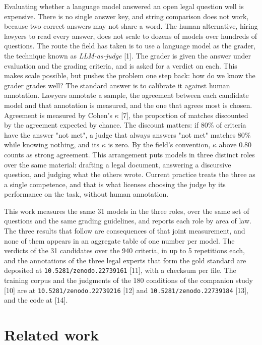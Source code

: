 \documentclass{IOS-Book-Article}
\begin{document}
Evaluating whether a language model answered an open legal question well is expensive. There is no single answer key, and string comparison does not work, because two correct answers may not share a word. The human alternative, hiring lawyers to read every answer, does not scale to dozens of models over hundreds of questions. The route the field has taken is to use a language model as the grader, the technique known as \emph{LLM-as-judge} [1]. The grader is given the answer under evaluation and the grading criteria, and is asked for a verdict on each. This makes scale possible, but pushes the problem one step back: how do we know the grader grades well? The standard answer is to calibrate it against human annotation. Lawyers annotate a sample, the agreement between each candidate model and that annotation is measured, and the one that agrees most is chosen. Agreement is measured by Cohen's $\kappa$ [7], the proportion of matches discounted by the agreement expected by chance. The discount matters: if 80\% of criteria have the answer "not met", a judge that always answers "not met" matches 80\% while knowing nothing, and its $\kappa$ is zero. By the field's convention, $\kappa$ above 0.80 counts as strong agreement. This arrangement puts models in three distinct roles over the same material: drafting a legal document, answering a discursive question, and judging what the others wrote. Current practice treats the three as a single competence, and that is what licenses choosing the judge by its performance on the task, without human annotation.

This work measures the same 31 models in the three roles, over the same set of questions and the same grading guidelines, and reports each role by area of law. The three results that follow are consequences of that joint measurement, and none of them appears in an aggregate table of one number per model. The verdicts of the 31 candidates over the 940 criteria, in up to 5 repetitions each, and the annotations of the three legal experts that form the gold standard are deposited at \texttt{10.5281/zenodo.22739161} [11], with a checksum per file. The training corpus and the judgments of the 180 conditions of the companion study [10] are at \texttt{10.5281/zenodo.22739216} [12] and \texttt{10.5281/zenodo.22739184} [13], and the code at [14].

\section{Related work}
\end{document}
